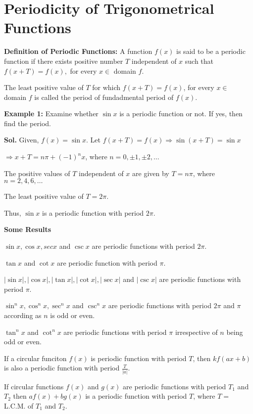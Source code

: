 \chapter{Periodicity of Trigonometrical Functions}
{\bf Definition of Periodic Functions:} A function $f(x)$ is said to be a periodic function if there
exists positive number $T$ independent of $x$ such that $f(x + T) = f(x),$ for every
$x\in$ domain $f$.

The least positive value of $T$ for which $f(x + T) = f(x)$, for every $x\in$ domain
$f$ is called the period of fundadmental period of $f(x)$.

{\bf Example 1:} Examine whether $\sin x$ is a periodic function or not. If yes, then find the period.

{\bf Sol.} Given, $f(x) = \sin x$. Let $f(x + T) = f(x) \Rightarrow \sin(x + T) = \sin x$

$\Rightarrow x + T = n\pi + (-1)^nx$, where $n = 0, \pm1, \pm2, \ldots$

The positive values of $T$ independent of $x$ are given by $T = n\pi$, where $n = 2,
4, 6, \ldots$

The least positive value of $T = 2\pi$.

Thus, $\sin x$ is a periodic function with period $2\pi$.

{\bf Some Results}
\startitemize[n]
\item $\sin x, \cos x, sec x$ and $\csc x$ are periodic functions with period $2\pi$.

\item $\tan x$ and $\cot x$ are periodic function with period $\pi$.

\item $|\sin x|, |\cos x|, |\tan x|, |\cot x|, |\sec x|$ and $|\csc x|$ are periodic functions
  with period $\pi$.

\item $\sin^nx, \cos^nx, \sec^nx$ and $\csc^nx$ are periodic functions with period $2\pi$
  and $\pi$ according as $n$ is odd or even.

\item $\tan^nx$ and $\cot^nx$ are periodic functions with period $\pi$ irrespective of
  $n$ being odd or even.

\item If a circular funciton $f(x)$ is periodic function with period $T$, then $kf(ax + b)$
  is also a periodic function with period $\frac{T}{|a|}$.

\item If circular functions $f(x)$ and $g(x)$ are periodic functions with period $T_1$ and
  $T_2$ then $af(x) + bg(x)$ is a periodic function with period $T$, where $T =$
  L.C.M. of $T_1$ and $T_2$.
  \stopitemize


